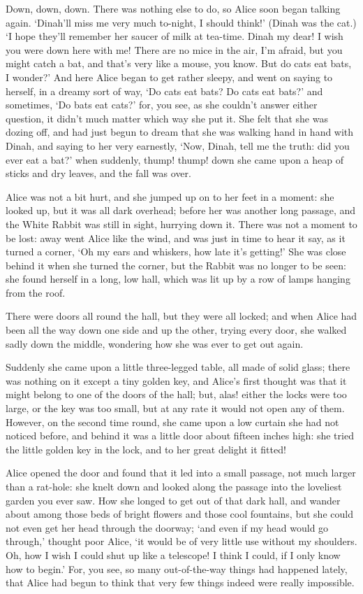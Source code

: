   Down, down, down.  There was nothing else to do, so Alice soon
began talking again.  `Dinah'll miss me very much to-night, I
should think!'  (Dinah was the cat.)  `I hope they'll remember
her saucer of milk at tea-time.  Dinah my dear!  I wish you were
down here with me!  There are no mice in the air, I'm afraid, but
you might catch a bat, and that's very like a mouse, you know.
But do cats eat bats, I wonder?'  And here Alice began to get
rather sleepy, and went on saying to herself, in a dreamy sort of
way, `Do cats eat bats?  Do cats eat bats?' and sometimes, `Do
bats eat cats?' for, you see, as she couldn't answer either
question, it didn't much matter which way she put it.  She felt
that she was dozing off, and had just begun to dream that she
was walking hand in hand with Dinah, and saying to her very
earnestly, `Now, Dinah, tell me the truth:  did you ever eat a
bat?' when suddenly, thump! thump! down she came upon a heap of
sticks and dry leaves, and the fall was over.

  Alice was not a bit hurt, and she jumped up on to her feet in a
moment:  she looked up, but it was all dark overhead; before her
was another long passage, and the White Rabbit was still in
sight, hurrying down it.  There was not a moment to be lost:
away went Alice like the wind, and was just in time to hear it
say, as it turned a corner, `Oh my ears and whiskers, how late
it's getting!'  She was close behind it when she turned the
corner, but the Rabbit was no longer to be seen:  she found
herself in a long, low hall, which was lit up by a row of lamps
hanging from the roof.

  There were doors all round the hall, but they were all locked;
and when Alice had been all the way down one side and up the
other, trying every door, she walked sadly down the middle,
wondering how she was ever to get out again.

  Suddenly she came upon a little three-legged table, all made of
solid glass; there was nothing on it except a tiny golden key,
and Alice's first thought was that it might belong to one of the
doors of the hall; but, alas! either the locks were too large, or
the key was too small, but at any rate it would not open any of
them.  However, on the second time round, she came upon a low
curtain she had not noticed before, and behind it was a little
door about fifteen inches high:  she tried the little golden key
in the lock, and to her great delight it fitted!

  Alice opened the door and found that it led into a small
passage, not much larger than a rat-hole:  she knelt down and
looked along the passage into the loveliest garden you ever saw.
How she longed to get out of that dark hall, and wander about
among those beds of bright flowers and those cool fountains, but
she could not even get her head through the doorway; `and even if
my head would go through,' thought poor Alice, `it would be of
very little use without my shoulders.  Oh, how I wish
I could shut up like a telescope!  I think I could, if I only
know how to begin.'  For, you see, so many out-of-the-way things
had happened lately, that Alice had begun to think that very few
things indeed were really impossible.

